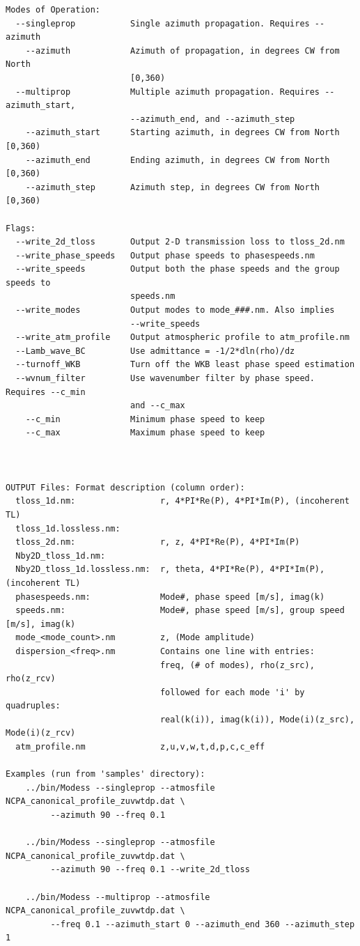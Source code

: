 \begin{verbatim}
Modes of Operation:
  --singleprop           Single azimuth propagation. Requires --azimuth
    --azimuth            Azimuth of propagation, in degrees CW from North
                         [0,360)
  --multiprop            Multiple azimuth propagation. Requires --azimuth_start,
                         --azimuth_end, and --azimuth_step
    --azimuth_start      Starting azimuth, in degrees CW from North [0,360)
    --azimuth_end        Ending azimuth, in degrees CW from North [0,360)
    --azimuth_step       Azimuth step, in degrees CW from North [0,360)

Flags:
  --write_2d_tloss       Output 2-D transmission loss to tloss_2d.nm
  --write_phase_speeds   Output phase speeds to phasespeeds.nm
  --write_speeds         Output both the phase speeds and the group speeds to
                         speeds.nm
  --write_modes          Output modes to mode_###.nm. Also implies
                         --write_speeds
  --write_atm_profile    Output atmospheric profile to atm_profile.nm
  --Lamb_wave_BC         Use admittance = -1/2*dln(rho)/dz
  --turnoff_WKB          Turn off the WKB least phase speed estimation
  --wvnum_filter         Use wavenumber filter by phase speed. Requires --c_min
                         and --c_max
    --c_min              Minimum phase speed to keep
    --c_max              Maximum phase speed to keep



OUTPUT Files: Format description (column order):
  tloss_1d.nm:                 r, 4*PI*Re(P), 4*PI*Im(P), (incoherent TL)
  tloss_1d.lossless.nm:
  tloss_2d.nm:                 r, z, 4*PI*Re(P), 4*PI*Im(P)
  Nby2D_tloss_1d.nm:
  Nby2D_tloss_1d.lossless.nm:  r, theta, 4*PI*Re(P), 4*PI*Im(P), (incoherent TL)
  phasespeeds.nm:              Mode#, phase speed [m/s], imag(k)
  speeds.nm:                   Mode#, phase speed [m/s], group speed [m/s], imag(k)
  mode_<mode_count>.nm         z, (Mode amplitude)
  dispersion_<freq>.nm         Contains one line with entries:
                               freq, (# of modes), rho(z_src), rho(z_rcv)
                               followed for each mode 'i' by quadruples:
                               real(k(i)), imag(k(i)), Mode(i)(z_src), Mode(i)(z_rcv)
  atm_profile.nm               z,u,v,w,t,d,p,c,c_eff

Examples (run from 'samples' directory):
    ../bin/Modess --singleprop --atmosfile NCPA_canonical_profile_zuvwtdp.dat \
         --azimuth 90 --freq 0.1

    ../bin/Modess --singleprop --atmosfile NCPA_canonical_profile_zuvwtdp.dat \
         --azimuth 90 --freq 0.1 --write_2d_tloss

    ../bin/Modess --multiprop --atmosfile NCPA_canonical_profile_zuvwtdp.dat \
         --freq 0.1 --azimuth_start 0 --azimuth_end 360 --azimuth_step 1

\end{verbatim}

